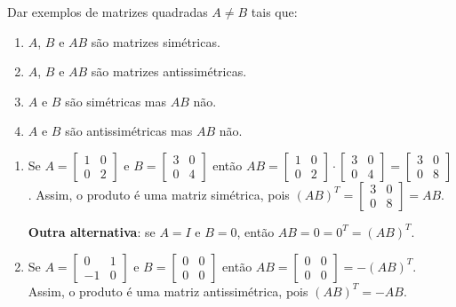 \documentclass[12pt,a4paper]{article}
\begin{document}
\begin{ExerciseList}
\Exercise[title={1,8}] Dar exemplos de matrizes quadradas $A \neq B$ tais que:
\begin{multicols}{2}
\begin{enumerate}
\item $A$, $B$ e $AB$ são matrizes simétricas.
\item $A$, $B$ e $AB$ são matrizes antissimétricas.
\item $A$ e $B$ são simétricas mas $AB$ não.
\item $A$ e $B$ são antissimétricas mas $AB$ não.
\end{enumerate}
\end{multicols}
\Answer
\begin{enumerate}
\item Se $A = \begin{bmatrix}
1 & 0 \\
0 & 2
\end{bmatrix}$ e $B = \begin{bmatrix}
3 & 0 \\
0 & 4
\end{bmatrix}$ então $AB
= \begin{bmatrix}
1 & 0 \\
0 & 2
\end{bmatrix}
\cdot
\begin{bmatrix}
3 & 0 \\
0 & 4
\end{bmatrix}
=
\begin{bmatrix}
3 & 0 \\
0 & 8
\end{bmatrix}$. Assim, o produto é uma matriz simétrica, pois $(AB)^T
=\begin{bmatrix}
3 & 0 \\
0 & 8
\end{bmatrix}
= AB$.

\textbf{Outra alternativa}: se $A = I$ e $B = 0$, então $AB = 0 = 0^T = (AB)^T$.

\item Se $A = \begin{bmatrix}
0 & 1 \\
-1 & 0
\end{bmatrix}$ e $B = \begin{bmatrix}
0 & 0 \\
0 & 0
\end{bmatrix}$ então $AB
= \begin{bmatrix}
0 & 0 \\
0 & 0
\end{bmatrix}
= -(AB)^T$. Assim, o produto é uma matriz antissimétrica, pois $(AB)^T = -AB$.


\end{enumerate}
\end{ExerciseList}
\end{document}
